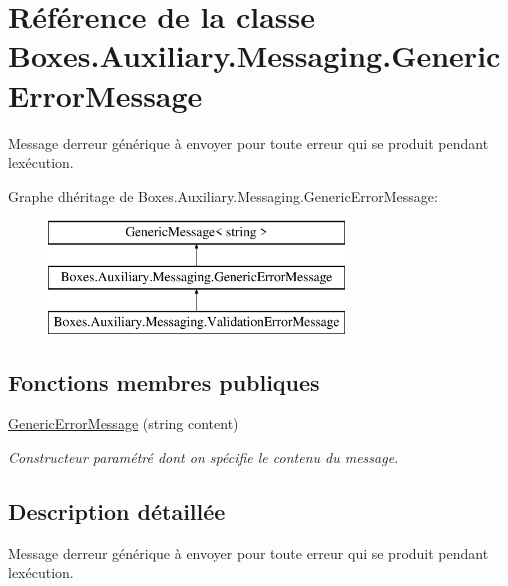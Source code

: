 \hypertarget{class_boxes_1_1_auxiliary_1_1_messaging_1_1_generic_error_message}{}\section{Référence de la classe Boxes.\+Auxiliary.\+Messaging.\+Generic\+Error\+Message}
\label{class_boxes_1_1_auxiliary_1_1_messaging_1_1_generic_error_message}


Message d\textquotesingle{}erreur générique à envoyer pour toute erreur qui se produit pendant l\textquotesingle{}exécution.  


Graphe d\textquotesingle{}héritage de Boxes.\+Auxiliary.\+Messaging.\+Generic\+Error\+Message\+:\begin{figure}[H]
\begin{center}
\leavevmode
\includegraphics[height=3.000000cm]{class_boxes_1_1_auxiliary_1_1_messaging_1_1_generic_error_message}
\end{center}
\end{figure}
\subsection*{Fonctions membres publiques}
\begin{DoxyCompactItemize}
\item 
\hyperlink{class_boxes_1_1_auxiliary_1_1_messaging_1_1_generic_error_message_af54cbb474f37482047808e9203cb7b08}{Generic\+Error\+Message} (string content)
\begin{DoxyCompactList}\small\item\em Constructeur paramétré dont on spécifie le contenu du message. \end{DoxyCompactList}\end{DoxyCompactItemize}


\subsection{Description détaillée}
Message d\textquotesingle{}erreur générique à envoyer pour toute erreur qui se produit pendant l\textquotesingle{}exécution. 



